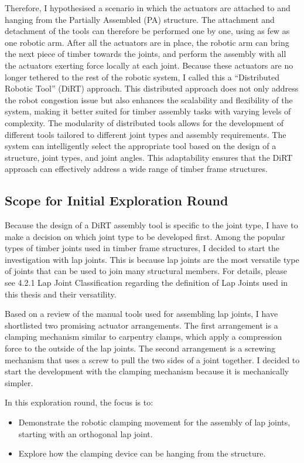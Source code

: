 Therefore, I hypothesised a scenario in which the actuators are attached to and hanging from the Partially Assembled (PA) structure. The attachment and detachment of the tools can therefore be performed one by one, using as few as one robotic arm. After all the actuators are in place, the robotic arm can bring the next piece of timber towards the joints, and perform the assembly with all the actuators exerting force locally at each joint. Because these actuators are no longer tethered to the rest of the robotic system, I called this a “Distributed Robotic Tool” (DiRT) approach. 
This distributed approach does not only address the robot congestion issue but also enhances the scalability and flexibility of the system, making it better suited for timber assembly tasks with varying levels of complexity. The modularity of distributed tools allows for the development of different tools tailored to different joint types and assembly requirements. The system can intelligently select the appropriate tool based on the design of a structure, joint types, and joint angles. This adaptability ensures that the DiRT approach can effectively address a wide range of timber frame structures.

\subsection{Scope for Initial Exploration Round}
Because the design of a DiRT assembly tool is specific to the joint type, I have to make a decision on which joint type to be developed first. Among the popular types of timber joints used in timber frame structures, I decided to start the investigation with lap joints. This is because lap joints are the most versatile type of joints that can be used to join many structural members. For details, please see 4.2.1 Lap Joint Classification regarding the definition of Lap Joints used in this thesis and their versatility.

Based on a review of the manual tools used for assembling lap joints, I have shortlisted two promising actuator arrangements. The first arrangement is a clamping mechanism similar to carpentry clamps, which apply a compression force to the outside of the lap joints. The second arrangement is a screwing mechanism that uses a screw to pull the two sides of a joint together. I decided to start the development with the clamping mechanism because it is mechanically simpler. 

In this exploration round, the focus is to:
\begin{itemize}
    \item Demonstrate the robotic clamping movement for the assembly of lap joints, starting with an orthogonal lap joint.
    \item Explore how the clamping device can be hanging from the structure.
\end{itemize}

